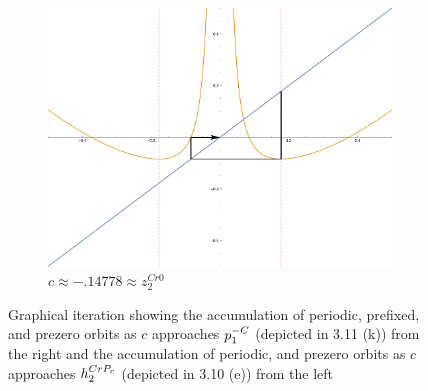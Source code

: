 \begin{figure}[ht]
\begin{subfigure}[b]{0.3\textwidth}
				\includegraphics[width=\textwidth]{./img/plot-014778}
				\caption{$c \approx -.14778 \approx z_2^{Cr0}$}
		\end{subfigure}
		\caption{Graphical iteration showing the accumulation of periodic, prefixed, and prezero orbits as $c$ approaches $p^{-C}_1$ (depicted in 3.11 (k)) from the right and the accumulation of periodic, and prezero orbits as $c$ approaches $h^{CrP_c}_2$ (depicted in 3.10 (e))  from the left}\label{fig:giters}
\end{figure}

